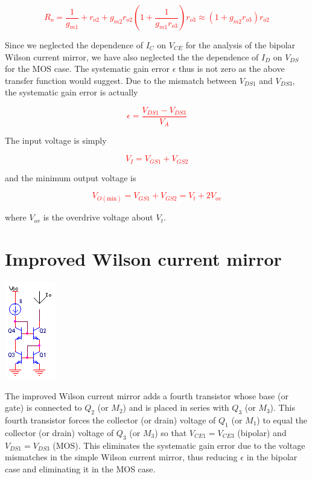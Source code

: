 \textcolor{red}{
\begin{equation}
R_{o} = \frac{1}{g_{m1}}+r_{o2}+g_{m2}r_{o2}\left(1+\frac{1}{g_{m1}r_{o3}}\right)r_{o3} \approx (1+g_{m2}r_{o3})r_{o2}
\end{equation}
}

Since we neglected the dependence of $I_{C}$ on $V_{CE}$ for the analysis of the bipolar Wilson current mirror, we have also neglected the the dependence of $I_{D}$ on $V_{DS}$ for the MOS case.
The systematic gain error $\epsilon$ thus is not zero as the above transfer function would suggest.
Due to the mismatch between $V_{DS1}$ and $V_{DS3}$, the systematic gain error is actually

\textcolor{red}{
\begin{equation}
\epsilon = \frac{V_{DS1}-V_{DS3}}{V_{A}}
\end{equation}
}

The input voltage is simply

\textcolor{red}{
\begin{equation}
V_{I} = V_{GS1}+V_{GS2}
\end{equation}
}

and the minimum output voltage is

\textcolor{red}{
\begin{equation}
V_{O(\text{min})} = V_{GS1}+V_{GS2} = V_{t}+2V_{ov}
\end{equation}
}

where $V_{ov}$ is the overdrive voltage about $V_{t}$.

\section{Improved Wilson current mirror}
\begin{center}
	\includegraphics{schematics/wilsoncurrentmirrorimproved.PNG}
\end{center}
The improved Wilson current mirror adds a fourth transistor whose base (or gate) is connected to $Q_2$ (or $M_2$) and is placed in series with $Q_3$ (or $M_3$).
This fourth transistor forces the collector (or drain) voltage of $Q_1$ (or $M_1$) to equal the collector (or drain) voltage of $Q_3$ (or $M_3$) so that $V_{CE1} = V_{CE3}$ (bipolar) and $V_{DS1} = V_{DS3}$ (MOS).
This eliminates the systematic gain error due to the voltage mismatches in the simple Wilson current mirror, thus reducing $\epsilon$ in the bipolar case and eliminating it in the MOS case. \autocite[277-278]{analysis-design-analog-ics}

